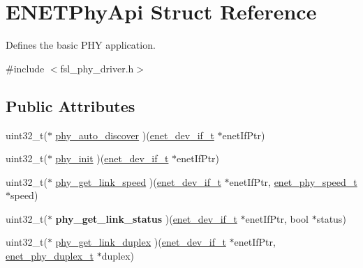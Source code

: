 \hypertarget{structENETPhyApi}{}\section{E\+N\+E\+T\+Phy\+Api Struct Reference}
\label{structENETPhyApi}


Defines the basic P\+HY application.  




{\ttfamily \#include $<$fsl\+\_\+phy\+\_\+driver.\+h$>$}

\subsection*{Public Attributes}
\begin{DoxyCompactItemize}
\item 
uint32\+\_\+t($\ast$ \hyperlink{structENETPhyApi_a5fb7842a439ac8f88c02a6a459cb200d}{phy\+\_\+auto\+\_\+discover} )(\hyperlink{group__enet__driver_ga497f30fbc93952e93d9fb8cf78480b75}{enet\+\_\+dev\+\_\+if\+\_\+t} $\ast$enet\+If\+Ptr)
\item 
uint32\+\_\+t($\ast$ \hyperlink{structENETPhyApi_a94209e4105bbdf2cbb6a59f7b1635674}{phy\+\_\+init} )(\hyperlink{group__enet__driver_ga497f30fbc93952e93d9fb8cf78480b75}{enet\+\_\+dev\+\_\+if\+\_\+t} $\ast$enet\+If\+Ptr)
\item 
uint32\+\_\+t($\ast$ \hyperlink{structENETPhyApi_a0e89a40c3e647f68471bc61b14629750}{phy\+\_\+get\+\_\+link\+\_\+speed} )(\hyperlink{group__enet__driver_ga497f30fbc93952e93d9fb8cf78480b75}{enet\+\_\+dev\+\_\+if\+\_\+t} $\ast$enet\+If\+Ptr, \hyperlink{group__phy__driver_ga6525c0ff103f370287f9995e8761b325}{enet\+\_\+phy\+\_\+speed\+\_\+t} $\ast$speed)
\item 
uint32\+\_\+t($\ast$ {\bfseries phy\+\_\+get\+\_\+link\+\_\+status} )(\hyperlink{group__enet__driver_ga497f30fbc93952e93d9fb8cf78480b75}{enet\+\_\+dev\+\_\+if\+\_\+t} $\ast$enet\+If\+Ptr, bool $\ast$status)\hypertarget{structENETPhyApi_a24803f79f57a6675812c428ca74953c2}{}\label{structENETPhyApi_a24803f79f57a6675812c428ca74953c2}

\item 
uint32\+\_\+t($\ast$ \hyperlink{structENETPhyApi_ad74440bb9244e9174a6633b27a8b4e68}{phy\+\_\+get\+\_\+link\+\_\+duplex} )(\hyperlink{group__enet__driver_ga497f30fbc93952e93d9fb8cf78480b75}{enet\+\_\+dev\+\_\+if\+\_\+t} $\ast$enet\+If\+Ptr, \hyperlink{group__phy__driver_ga0c6955577513a799936696749860cf0b}{enet\+\_\+phy\+\_\+duplex\+\_\+t} $\ast$duplex)
\end{DoxyCompactItemize}


